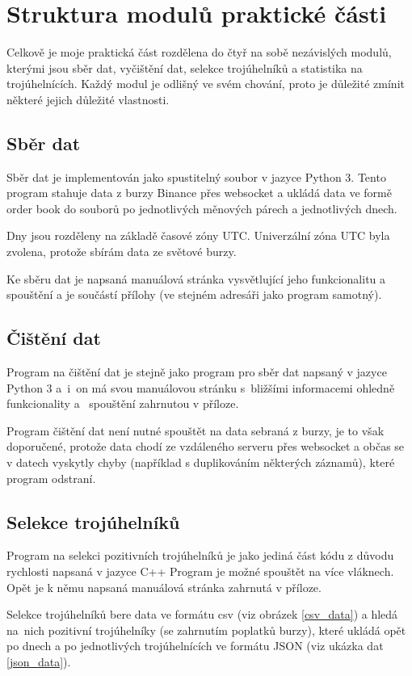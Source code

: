 \documentclass[thesis=B,czech]{FITthesis}[2019/03/21]
\begin{document}
\section{Struktura modulů praktické části}
Celkově je moje praktická část rozdělena do čtyř na sobě nezávislých modulů, kterými jsou sběr dat, vyčištění dat, selekce trojúhelníků a statistika na trojúhelnících. Každý modul je odlišný ve svém chování, proto je důležité zmínit některé jejich důležité vlastnosti.

\subsection{Sběr dat}
Sběr dat je implementován jako spustitelný soubor v jazyce Python 3. Tento program stahuje data z burzy Binance přes websocket a ukládá data ve formě order book do souborů po jednotlivých měnových párech a jednotlivých dnech.

Dny jsou rozděleny na základě časové zóny UTC. Univerzální zóna UTC byla zvolena, protože sbírám data ze světové burzy. 

Ke sběru dat je napsaná manuálová stránka vysvětlující jeho funkcionalitu a spouštění a je součástí přílohy (ve stejném adresáři jako program samotný).

\subsection{Čištění dat}
\label{subsection:cleanup}
Program na čištění dat je stejně jako program pro sběr dat napsaný v jazyce Python 3 a~i~on má svou manuálovou stránku s~bližšími informacemi ohledně funkcionality a~ spouštění zahrnutou v příloze. 

Program čištění dat není nutné spouštět na data sebraná z burzy, je to však doporučené, protože data chodí ze vzdáleného serveru přes websocket a občas se v datech vyskytly chyby (například s duplikováním některých záznamů), které program odstraní.

\subsection{Selekce trojúhelníků}
Program na selekci pozitivních trojúhelníků je jako jediná část kódu z důvodu rychlosti napsaná v jazyce C++ Program je možné spouštět na více vláknech. Opět je k němu napsaná manuálová stránka zahrnutá v příloze. 

Selekce trojúhelníků bere data ve formátu csv (viz obrázek \ref{csv_data}) a hledá na~nich pozitivní trojúhelníky (se zahrnutím poplatků burzy), které ukládá opět po dnech a po jednotlivých trojúhelnících ve formátu JSON (viz ukázka dat \ref{json_data}).
\end{document}
